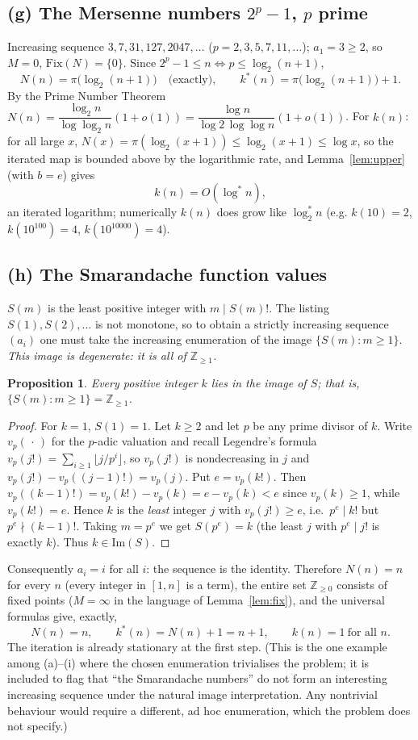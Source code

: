 \documentclass[12pt]{article}
\newtheorem{proposition}{Proposition}
\theoremstyle{definition}
\begin{document}
\subsection{(g) The Mersenne numbers $2^p-1$, $p$ prime}
Increasing sequence $3,7,31,127,2047,\dots$ ($p=2,3,5,7,11,\dots$); $a_1=3\ge2$, so
$M=0$, $\mathrm{Fix}(N)=\{0\}$. Since $2^p-1\le n\iff p\le\log_2(n+1)$,
\[
  N(n)=\pi\bigl(\log_2(n+1)\bigr)\quad\text{(exactly)},\qquad
  k^*(n)=\pi\bigl(\log_2(n+1)\bigr)+1.
\]
By the Prime Number Theorem $N(n)=\dfrac{\log_2 n}{\log\log_2 n}(1+o(1))
=\dfrac{\log n}{\log2\,\log\log n}(1+o(1))$. For $k(n)$: for all large $x$,
$N(x)=\pi(\log_2(x+1))\le\log_2(x+1)\le\log x$, so the iterated map is bounded above
by the logarithmic rate, and Lemma~\ref{lem:upper} (with $b=e$) gives
\[
  k(n)=O(\log^* n),
\]
an iterated logarithm; numerically $k(n)$ does grow like $\log^*_2 n$ (e.g.
$k(10)=2$, $k(10^{100})=4$, $k(10^{10000})=4$).

\subsection{(h) The Smarandache function values}
$S(m)$ is the least positive integer with $m\mid S(m)!$. The listing $S(1),S(2),\dots$
is not monotone, so to obtain a strictly increasing sequence $(a_i)$ one must take the
increasing enumeration of the image $\{S(m):m\ge1\}$. \emph{This image is degenerate:
it is all of $\mathbb Z_{\ge1}$.}

\begin{proposition}\label{prop:smar}
Every positive integer $k$ lies in the image of $S$; that is, $\{S(m):m\ge1\}=\mathbb
Z_{\ge1}$.
\end{proposition}

\begin{proof}
For $k=1$, $S(1)=1$. Let $k\ge2$ and let $p$ be any prime divisor of $k$. Write
$v_p(\,\cdot\,)$ for the $p$-adic valuation and recall Legendre's formula
$v_p(j!)=\sum_{i\ge1}\lfloor j/p^i\rfloor$, so $v_p(j!)$ is nondecreasing in $j$ and
$v_p(j!)-v_p((j-1)!)=v_p(j)$. Put $e=v_p(k!)$. Then
$v_p((k-1)!)=v_p(k!)-v_p(k)=e-v_p(k)<e$ since $v_p(k)\ge1$, while $v_p(k!)=e$. Hence
$k$ is the \emph{least} integer $j$ with $v_p(j!)\ge e$, i.e.\ $p^e\mid k!$ but
$p^e\nmid (k-1)!$. Taking $m=p^e$ we get $S(p^e)=k$ (the least $j$ with $p^e\mid j!$
is exactly $k$). Thus $k\in\mathrm{Im}(S)$.
\end{proof}

Consequently $a_i=i$ for all $i$: the sequence is the identity. Therefore $N(n)=n$ for
every $n$ (every integer in $[1,n]$ is a term), the entire set $\mathbb Z_{\ge0}$
consists of fixed points ($M=\infty$ in the language of Lemma~\ref{lem:fix}), and the
universal formulas give, exactly,
\[
  N(n)=n,\qquad k^*(n)=N(n)+1=n+1,\qquad k(n)=1\ \text{for all }n .
\]
The iteration is already stationary at the first step. (This is the one example among
(a)--(i) where the chosen enumeration trivialises the problem; it is included to
flag that ``the Smarandache numbers'' do not form an interesting increasing sequence
under the natural image interpretation. Any nontrivial behaviour would require a
different, ad hoc enumeration, which the problem does not specify.)
\end{document}
